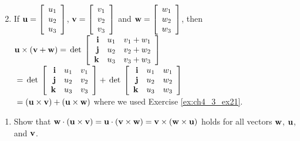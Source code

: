 \begin{multicols}{2}
\begin{ex}
\begin{sol}
\begin{enumerate}[label={\alph*.}]
\setcounter{enumi}{1} 
\item If
$\textbf{u} = \left[
\begin{array}{r}
u_{1}\\
u_{2}\\
u_{3}
\end{array}
\right]$,
$\textbf{v} = \left[
\begin{array}{r}
v_{1}\\
v_{2}\\
v_{3}
\end{array}
\right]$ and
$\textbf{w} = \left[
\begin{array}{r}
w_{1}\\
w_{2}\\
w_{3}
\end{array}
\right]$, then
$\textbf{u} \times (\textbf{v} + \textbf{w}) = \thinspace\operatorname{det\medspace}\left[
\begin{array}{rrr}
\textbf{i} & u_{1} & v_{1} + w_{1}\\
\textbf{j} & u_{2} & v_{2} + w_{2}\\
\textbf{k} & u_{3} & v_{3} + w_{3}
\end{array}
\right]$ \\
${} = 
\thinspace\operatorname{det\medspace}\left[
\begin{array}{rrr}
\textbf{i} & u_{1} & v_{1}\\
\textbf{j} & u_{2} & v_{2}\\
\textbf{k} & u_{3} & v_{3}
\end{array}
\right]
+
\thinspace\operatorname{det\medspace}\left[
\begin{array}{rrr}
\textbf{i} & u_{1} & w_{1}\\
\textbf{j} & u_{2} & w_{2}\\
\textbf{k} & u_{3} & w_{3}
\end{array}
\right]$ \\ ${} = (\textbf{u} \times \textbf{v}) + (\textbf{u} \times \textbf{w})$
where we used Exercise \ref{ex:ch4_3_ex21}. 
\end{enumerate}
\end{sol}
\end{ex}

\begin{ex} \label{ex:ch4_3_ex16}
\begin{enumerate}[label={\alph*.}]
\item Show that $\textbf{w} \cdot (\textbf{u} \times \textbf{v}) = \textbf{u} \cdot (\textbf{v} \times \textbf{w}) = \textbf{v} \times (\textbf{w} \times \textbf{u})$ holds for all vectors $\textbf{w}$, $\textbf{u}$, and $\textbf{v}$.


\end{enumerate}
\end{ex}
\end{multicols}

